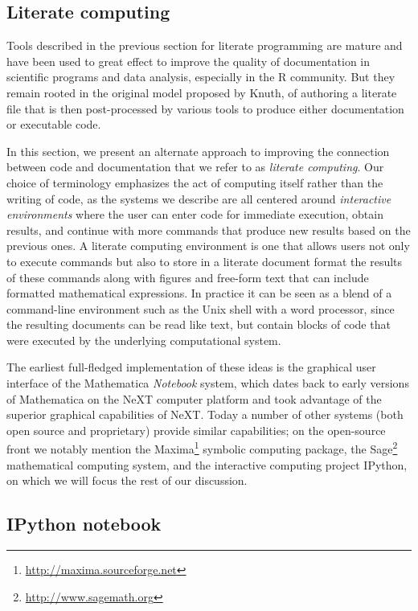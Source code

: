 \documentclass[11pt,oneside,english]{article}
\begin{document}
\subsection{Literate computing}

Tools described in the previous section for literate programming are mature and
have been used to great effect to improve the quality of documentation in
scientific programs and data analysis, especially in the R community.  But they
remain rooted in the original model proposed by Knuth, of authoring a
literate file that is then post-processed by various tools to produce either
documentation or executable code.  

In this section, we present an alternate approach to improving the connection
between code and documentation that we refer to as \emph{literate computing}.
Our choice of terminology emphasizes the act of computing itself rather than
the writing of code, as the systems we describe are all centered around
\emph{interactive environments} where the user can enter code for immediate
execution, obtain results, and continue with more commands that produce new
results based on the previous ones.  A literate computing environment is one
that allows users not only to execute commands but also to store in a literate
document format the results of these commands along with figures and free-form
text that can include formatted mathematical expressions.  In practice it can
be seen as a blend of a command-line environment such as the Unix shell with a
word processor, since the resulting documents can be read like text, but
contain blocks of code that were executed by the underlying computational
system.

The earliest full-fledged implementation of these ideas is the graphical user
interface of the Mathematica \emph{Notebook} system, which dates back to early
versions of Mathematica on the NeXT computer platform and took advantage of the
superior graphical capabilities of NeXT.  Today a number of other systems (both
open source and proprietary) provide similar capabilities; on the open-source
front we notably mention the
Maxima\footnote{\url{http://maxima.sourceforge.net}} symbolic computing
package, the Sage\footnote{\url{http://www.sagemath.org}} mathematical
computing system, and the interactive computing project IPython, on which we
will focus the rest of our discussion.

\subsection{IPython notebook}\label{subsec:IPython}
\end{document}
